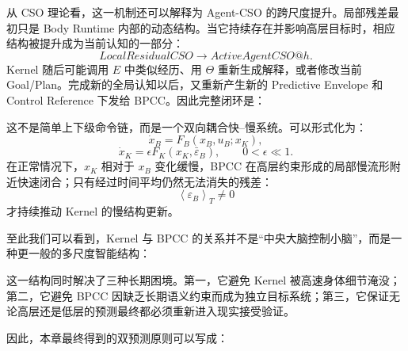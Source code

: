 从 CSO 理论看，这一机制还可以解释为 Agent-CSO 的跨尺度提升。局部残差最初只是 Body Runtime 内部的动态结构。当它持续存在并影响高层目标时，相应结构被提升成为当前认知的一部分：
\[
LocalResidualCSO
\rightarrow
ActiveAgentCSO@h.
\]
Kernel 随后可能调用 $E$ 中类似经历、用 $\Theta$ 重新生成解释，或者修改当前 Goal/Plan。完成新的全局认知以后，又重新产生新的 Predictive Envelope 和 Control Reference 下发给 BPCC。因此完整闭环是：
\begin{statementbox}
\centering
{}
\end{statementbox}

这不是简单上下级命令链，而是一个双向耦合快--慢系统。可以形式化为：
\[
\dot x_B
=
F_B
(x_B,u_B;x_K),
\]
\[
\dot x_K
=
\epsilon
F_K
(x_K,\bar\varepsilon_B),
\qquad
0<\epsilon\ll1.
\]
在正常情况下，$x_K$ 相对于 $x_B$ 变化缓慢，BPCC 在高层约束形成的局部慢流形附近快速闭合；只有经过时间平均仍然无法消失的残差：
\[
\left\langle
\varepsilon_B
\right\rangle_T
\neq0
\]
才持续推动 Kernel 的慢结构更新。

至此我们可以看到，Kernel 与 BPCC 的关系并不是“中央大脑控制小脑”，而是一种更一般的多尺度智能结构：

\begin{statementbox}
\centering
{}
\end{statementbox}

这一结构同时解决了三种长期困境。第一，它避免 Kernel 被高速身体细节淹没；第二，它避免 BPCC 因缺乏长期语义约束而成为独立目标系统；第三，它保证无论高层还是低层的预测最终都必须重新进入现实接受验证。

因此，本章最终得到的双预测原则可以写成：

\begin{statementbox}
\centering
{}
\end{statementbox}

